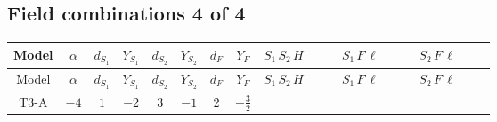 \documentclass[8pt]{article}
\begin{document}
\begin{landscape}
\subsection*{Field combinations 4 of 4}
\begin{longtable}{@{}cccccccc >{\raggedright\arraybackslash}p{0.21\linewidth} >{\raggedright\arraybackslash}p{0.21\linewidth} >{\raggedright\arraybackslash}p{0.21\linewidth}@{}}
\toprule
Model & $\alpha$ & $d_{S_1}$ & $Y_{S_1}$ & $d_{S_2}$ & $Y_{S_2}$ & $d_F$ & $Y_F$ & $S_1\,S_2\,H$ & $S_1\,F\,\ell$ & $S_2\,F\,\ell$ \\
\midrule
\endfirsthead
\toprule
Model & $\alpha$ & $d_{S_1}$ & $Y_{S_1}$ & $d_{S_2}$ & $Y_{S_2}$ & $d_F$ & $Y_F$ & $S_1\,S_2\,H$ & $S_1\,F\,\ell$ & $S_2\,F\,\ell$ \\
\midrule
\endhead
T3-A & $-4$ & $1$ & $-2$ & $3$ & $-1$ & $2$ & $-\frac{3}{2}$ & \scriptsize\adjustbox{max width=\linewidth}{$\begin{gathered} +\overline{\lambda_5} S_{2,j_1} {\mathcal{I}_{LLS_1S_2}}^{*}_{a_1,a_2,j_1} H_{a_1}{}^{\dagger } H_{a_2}{}^{\dagger } S_1{}^{\dagger } \\ +H_{a_1} H_{a_2} S_1 \mathcal{I}_{T3,a_1,a_2,j_1} \lambda_5 S_{2,j_1}{}^{\dagger }\end{gathered}$} & \scriptsize\adjustbox{max width=\linewidth}{$\begin{gathered} +\overline{L_{a_1,i_1}}\, C\, P_R\, \overline{F_{j_1,r_1}}{}^T S_1 y_{1,i_1,r_1} \mathcal{I}_{y_1,a_1,j_1} \\ +\overline{y_{1,i_1,r_1}} L_{a_1,i_1}{}^T\, C\, P_L\, F_{j_1,r_1} {\mathcal{C}_{LS_1F}}^{*}_{a_1,j_1} S_1{}^{\dagger }\end{gathered}$} & \scriptsize\adjustbox{max width=\linewidth}{$\begin{gathered} +\overline{y_{2,i_1,r_1}} \overline{F_{j_1,r_1}}\, P_L\, L_{a_1,i_1} S_{2,j_1} {\mathcal{C}_{LS_2F}}^{*}_{a_1,j_1,j_1} \\ +\overline{L_{a_1,i_1}}\, P_R\, F_{j_1,r_1} y_{2,i_1,r_1} \mathcal{I}_{y_2,a_1,j_1,j_1} S_{2,j_1}{}^{\dagger }\end{gathered}$} \\
\midrule

\end{longtable}
\end{landscape}
\end{document}
